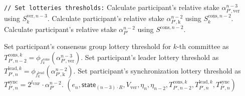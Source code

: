 \begin{protocol}
\begin{algorithmic}[1]
        \noindent
        \lstinline|// Set lotteries thresholds:|
        \State Calculate participant's relative stake $\alpha^{n-3}_{P', \text{ver}}$ using $S_k^{\text{ver}, {n - 3}}$.
        \State Calculate participant's relative stake $\alpha^{n-2}_{P', \text{k}}$ using $S_k^{\text{cons}, {n - 2}}$.
        \State Calculate participant's relative stake $\alpha^{n-2}_{P'}$ using $S^{\text{cons}, {n - 2}}$.

        \State Set participant's consensus group lottery threshold for $k$-th committee as $T_{P', n-2}^{\text{cons}, k} = \phi_{f^{\text{cons}}_k}(\alpha^{n-3}_{P', \text{ver}})$.
        \State Set participant's leader lottery threshold as $T_{P', n}^{\text{lead}, k} = \phi_{f^{\text{lead}}_k}(\alpha^{n-2}_{P', \text{k}})$.
        \State Set participant's synchronization lottery threshold as $T_{P', n}^{\text{sync}} = 2^{l_{\text{VRF}}} \cdot \alpha^{n-2}_{P'}$.
        \State \Return ${(e_n, \textsf{state}_{(n - 3)\cdot R}, V_{\text{ver}}, \eta_{n}, \eta_{n - 2}, T_{P', n-2}^{\text{cons}, k}, T_{P', n}^{\text{lead}, k}, T_{P', n}^{\text{sync}})}$
    \end{algorithmic}\label{alg:prepare-block-validation}
\end{protocol}

